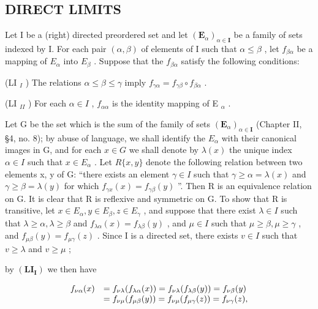 \subsection{DIRECT LIMITS}

Let I be a (right) directed preordered set and let \((\mathbf{E}_{\alpha})_{\alpha\in\mathbf{I}}\) be a family of sets indexed by I. For each pair \((\alpha,\beta)\) of elements of I such that \(\alpha\leqslant\beta\) , let \(f_{\beta\alpha}\) be a mapping of \(E_{\alpha}\) into \(E_{\beta}\) . Suppose that the \(f_{\beta\alpha}\) satisfy the following conditions:

(LI \(_{I}\) ) The relations \(\alpha \leqslant \beta \leqslant \gamma\) imply \(f_{\gamma\alpha} = f_{\gamma\beta} \circ f_{\beta\alpha}\) .

(LI \(_{II}\) ) For each \(\alpha \in I\) , \(f_{\alpha\alpha}\) is the identity mapping of E \(_{\alpha}\) .

Let G be the set which is the sum of the family of sets \((\mathbf{E}_{\alpha})_{\alpha\in\mathbf{I}}\) (Chapter II, §4, no. 8); by abuse of language, we shall identify the \(E_{\alpha}\) with their canonical images in G, and for each \(x\in G\) we shall denote by \(\lambda(x)\) the unique index \(\alpha\in I\) such that \(x\in E_{\alpha}\) . Let \(R\{x,y\}\) denote the following relation between two elements x, y of G: ``there exists an element \(\gamma\in I\) such that \(\gamma\geqslant\alpha=\lambda(x)\) and \(\gamma\geqslant\beta=\lambda(y)\) for which \(f_{\gamma x}(x)=f_{\gamma\beta}(y)\) ''. Then R is an equivalence relation on G. It is clear that R is reflexive and symmetric on G. To show that R is transitive, let \(x\in E_{\alpha}, y\in E_{\beta}, z\in E_{\gamma}\) , and suppose that there exist \(\lambda\in I\) such that \(\lambda\geqslant\alpha,\lambda\geqslant\beta\) and \(f_{\lambda\alpha}(x)=f_{\lambda\beta}(y)\) , and \(\mu\in I\) such that \(\mu\geqslant\beta,\mu\geqslant\gamma\) , and \(f_{\mu\beta}(y)=f_{\mu\gamma}(z)\) . Since I is a directed set, there exists \(v\in I\) such that \(v\geqslant\lambda\) and \(v\geqslant\mu\) ;

by \((\mathbf{LI}_{\mathbf{I}})\) we then have

\[
\begin{array}{r l} f _ {\nu \alpha} (x) & = f _ {\nu \lambda} (f _ {\lambda \alpha} (x)) = f _ {\nu \lambda} (f _ {\lambda \beta} (y)) = f _ {\nu \beta} (y) \\ & = f _ {\nu \mu} (f _ {\mu \beta} (y)) = f _ {\nu \mu} (f _ {\mu \gamma} (z)) = f _ {\nu \gamma} (z), \end{array}
\]

